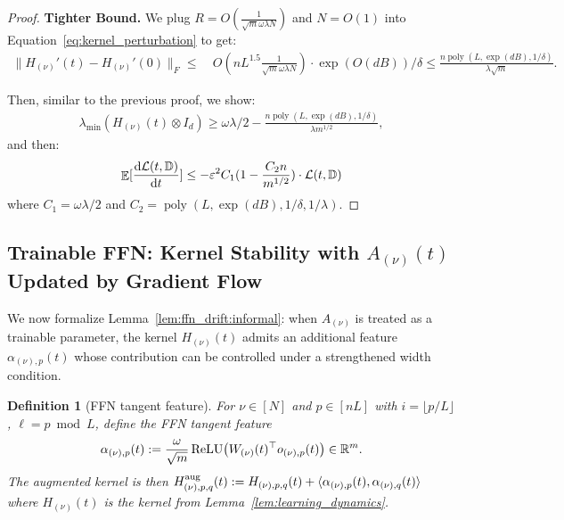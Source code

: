 \documentclass[11pt]{article}
\theoremstyle{plain}
\newtheorem{definition}[theorem]{Definition}
\newcommand{\R}{\mathbb{R}}
\renewcommand{\d}{\mathrm{d}}
\DeclareMathOperator*{\E}{{\mathbb{E}}}
\DeclareMathOperator{\poly}{poly}
\begin{document}
\begin{proof}
    {\bf Tighter Bound.} We plug $R = O(\frac{1}{\sqrt{m}  \omega\lambda N})$ and $N = O(1)$ into Equation~\eqref{eq:kernel_perturbation} to get:
    \begin{align*}
        \| H_{(\nu)}'(t) - H_{(\nu)}'(0) \|_F 
        \leq & ~ O(nL^{1.5}\frac{1}{\sqrt{m}  \omega\lambda N}) \cdot \exp(O(dB)) /\delta \leq \frac{  n\poly( L, \exp(dB), 1/\delta) }{ \lambda \sqrt{m}}.
    \end{align*}


    Then, similar to the previous proof, we show:
    \begin{align*}
        \lambda_{\min}(H_{(\nu)}(t) \otimes I_d ) \ge \omega\lambda / 2 - \frac{ n \poly( L, \exp(dB), 1/\delta) }{\lambda m^{1/2}},
    \end{align*}
    and then:
    \begin{align}\label{eq:tighter_dynamics}
        \E[\frac{\d {\cal L}(t, \mathbb{D})}{\d t}] \leq - \varepsilon^2 C_1(1 - \frac{C_2n}{ m^{1/2}} ) \cdot {\cal L}(t, \mathbb{D})
    \end{align}
    where $C_1 = \omega \lambda / 2$ and $C_2 =\poly( L, \exp(dB), 1/\delta, 1/\lambda)$.
\end{proof}

\subsection{Trainable FFN: Kernel Stability with \texorpdfstring{$A_{(\nu)}(t)$}{A(t)} Updated by Gradient Flow}\label{app_sub:trainable_ffn}

We now formalize Lemma~\ref{lem:ffn_drift:informal}: when $A_{(\nu)}$ is treated as a trainable parameter, the kernel $H_{(\nu)}(t)$ admits an additional feature $\alpha_{(\nu),p}(t)$ whose contribution can be controlled under a strengthened width condition.

\begin{definition}[FFN tangent feature]\label{def:alpha_feature}
    For $\nu\in[N]$ and $p\in[nL]$ with $i = \lfloor p/L\rfloor$, $\ell = p\bmod L$, define the FFN tangent feature
    \begin{align*}
        \alpha_{(\nu), p}(t) := \frac{\omega}{\sqrt{m}}\,{\rm ReLU}\big(W_{(\nu)}(t)^\top o_{(\nu),p}(t)\big) \in \R^{m}.
    \end{align*}
    The augmented kernel is then $H_{(\nu),p,q}^{\rm aug}(t) := H_{(\nu),p,q}(t) + \langle \alpha_{(\nu),p}(t),\alpha_{(\nu),q}(t)\rangle$ where $H_{(\nu)}(t)$ is the kernel from Lemma~\ref{lem:learning_dynamics}.
\end{definition}
\end{document}

